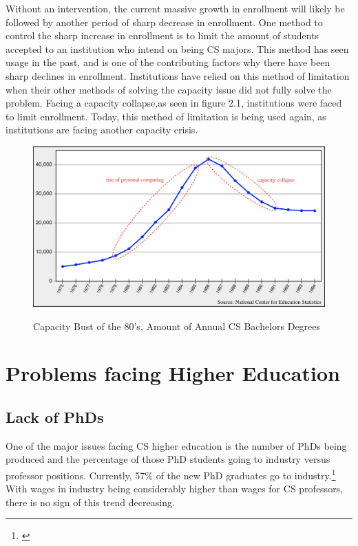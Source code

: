 \documentclass[12pt,twoside]{reedthesis}
\begin{document}
Without an intervention, the current massive growth in enrollment will likely be followed by another period of sharp decrease in enrollment. One method to control the sharp increase in enrollment is to limit the amount of students accepted to an institution who intend on being CS majors. This method has seen usage in the past, and is one of the contributing factors why there have been sharp declines in enrollment. Institutions have relied on this method of limitation when their other methods of solving the capacity issue did not fully solve the problem. Facing a capacity collapse,as seen in figure 2.1, institutions were faced to limit enrollment. Today, this method of limitation is being used again, as institutions are facing another capacity crisis. 
\begin{figure}[htbp] 
\begin{centering} 
\caption{Capacity Bust of the 80's, Amount of Annual CS Bachelors Degrees}
\includegraphics[scale=0.345] {computerbust}
\label{animexample}
\end{centering} 
\end{figure}

\section{Problems facing Higher Education}

\subsection{Lack of PhDs}
One of the major issues facing CS higher education is the number of PhDs being produced and the percentage of those PhD students going to industry versus professor positions. Currently, 57\% of the new PhD graduates go to industry.\footnote{\cite{zweben_another_2018}} With wages in industry being considerably higher than wages for CS professors, there is no sign of this trend decreasing. 
\end{document}
